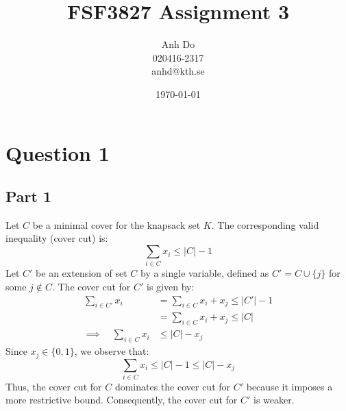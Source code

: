 \documentclass{article}
\title{FSF3827 Assignment 3}
\author{Anh Do \\ 020416-2317 \\ anhd@kth.se}
\date{\today}
\begin{document}
\maketitle

\section*{Question 1}
    \subsection*{Part 1}
    Let $C$ be a minimal cover for the knapsack set $K$. The corresponding valid inequality (cover cut) is:
    \[
        \sum_{i \in C} x_i \leq |C| - 1
    \]
    Let $C'$ be an extension of set $C$ by a single variable, defined as $C' = C \cup \{j\}$ for some $j \notin C$. 
    The cover cut for $C'$ is given by:
    \begin{align*}
        \sum_{i \in C'} x_i &= \sum_{i \in C} x_i + x_j \leq |C'| - 1 \\
        &= \sum_{i \in C} x_i + x_j \leq |C| \\
        \implies \quad \sum_{i \in C} x_i &\leq |C| - x_j
    \end{align*}
    Since $x_j \in \{0,1\}$, we observe that:
    \[
        \sum_{i \in C} x_i \leq |C|-1 \leq |C|-x_j
    \]
    Thus, the cover cut for $C$ dominates the cover cut for $C'$ because it imposes a more restrictive bound. 
    Consequently, the cover cut for $C'$ is weaker.
    
\end{document}

